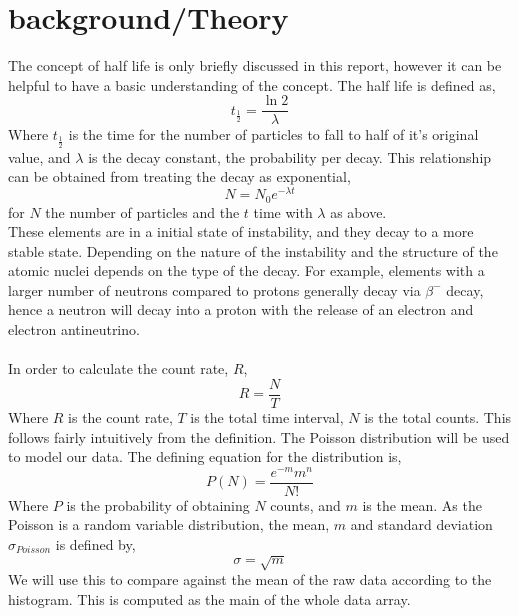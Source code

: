 \documentclass[11pt]{article}
\begin{document}
    \section{background/Theory}
    The concept of half life is only briefly discussed in this report, however it can be helpful to have a basic understanding of the concept. The half life is defined as,
    \begin{equation}
        t_{\frac{1}{2}} = \frac{\ln{2}}{\lambda}
    \end{equation}
    Where $ t_{\frac{1}{2}}$ is the time for the number of particles to fall to half of it's original value, and $\lambda$ is the decay constant, the probability per decay. This relationship can be obtained from treating the decay as exponential, 
    $$N = N_0 e^{-\lambda t}$$
    for $N$ the number of particles and the $t$ time with $\lambda$ as above. 
   \\
   These elements are in a initial state of instability, and they decay to a more stable state. Depending on the nature of the instability and the structure of the atomic nuclei depends on the type of the decay. For example, elements with a larger number of neutrons compared to protons generally decay via $\beta^{-}$ decay, hence a neutron will decay into a proton with the release of an electron and electron antineutrino. 
   \\
   \\
   In order to calculate the count rate, $R$, 
   \begin{equation} R = \frac{N}{T}
   \end{equation}
   Where $R$ is the count rate, $T$ is the total time interval, $N$ is the total counts. This follows fairly intuitively from the definition. 
    The Poisson distribution will be used to model our data. The defining equation for the distribution is, 
    \begin{equation}
        P(N) = \frac{e^{-m}m^{n}}{N!}
    \end{equation}
    Where $P$ is the probability of obtaining $N$ counts, and $m$ is the mean.
    As the Poisson is a random variable distribution, the mean, $m$ and standard deviation $\sigma_{Poisson}$ is defined by,
    \begin{equation}
        \sigma = \sqrt{m}
    \end{equation}
    We will use this to compare against the mean of the raw data according to the histogram. This is computed as the main of the whole data array. 
     \newline 
\end{document}
